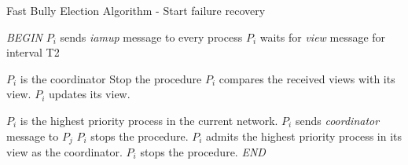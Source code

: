 \documentclass[dareport.tex]{subfiles}
\begin{document}
\begin{algorithm}[H]
	\caption{Fast Bully Election Algorithm - Start failure recovery}
	\label{fast-bully-algorithm-start-failure-recovery}
	\begin{algorithmic}[1]
		\BState \emph{BEGIN}
		\State $P_{i}$ sends \emph{iamup} message to every process
		\State $P_{i}$ waits for \emph{view} message for interval T2
		
		\Comment $P_{i}$ is the coordinator
		\State Stop the procedure
		\Else
		\State $P_{i}$ compares the received views with its view.
			\State $P_{i}$ updates its view.
		\EndIf
		
		\Comment $P_{i}$ is the highest priority process in the current network.
				\State $P_{i}$ sends \emph{coordinator} message to $P_{j}$
				\State $P_{i}$ stops the procedure.
			\EndFor
		\Else
			\State $P_{i}$ admits the highest priority process in its view as the coordinator.
			\State $P_{i}$ stops the procedure.
		\EndIf
		\EndIf
		\EndProcedure
		\BState \emph{END}
	\end{algorithmic}
\end{algorithm}
\end{document}
